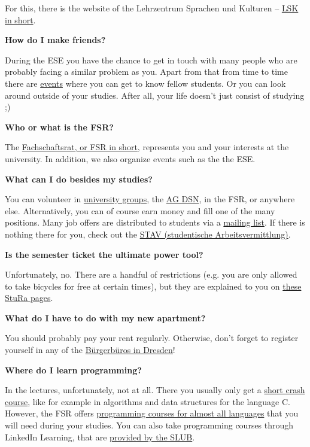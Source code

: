 For this, there is the website of the Lehrzentrum Sprachen und Kulturen -- \hyperlink{sec:sprache}{LSK in short}.

\textbf{How do I make friends?}

During the ESE you have the chance to get in touch with many people who are probably facing a similar problem as you. Apart from that from time to time there are \hyperlink{cha:veranstaltungen}{events} where you can get to know fellow students. 
Or you can look around outside of your studies. After all, your life doesn't just consist of studying ;)

\textbf{Who or what is the FSR?}

The \hyperlink{sec:fachschaftsrat}{Fachschaftsrat, or FSR in short,} 
represents you and your interests at the university. 
In addition, we also organize events such as the the ESE. 

\textbf{What can I do besides my studies?}

You can volunteer in \hyperlink{sec:hsg}{university groups}, the \href{https://www.agdsn.de}{AG DSN}, 
in the FSR, or anywhere else.
Alternatively, you can of course earn money and fill one of the many positions.
Many job offers are distributed to students via a 
\href{https://lists.ifsr.de/mm3/postorius/lists/extern.ifsr.de/}{mailing list}.
If there is nothing there for you, check out the 
\href{https://www.stav-dresden.de}{STAV (studentische Arbeitsvermittlung)}. 

\textbf{Is the semester ticket the ultimate power tool?}

Unfortunately, no. 
There are a handful of restrictions (e.g. you are only allowed to take bicycles for free at certain times),
but they are explained to you on \href{https://www.stura.tu-dresden.de/semesterticket}{these StuRa pages}.

\textbf{What do I have to do with my new apartment?}

You should probably pay your rent regularly. 
Otherwise, don't forget to register yourself in any of the \hyperlink{sec:ummelden}{Bürgerbüros in Dresden}!

\textbf{Where do I learn programming?}

In the lectures, unfortunately, not at all. 
There you usually only get a \hyperlink{sec:aud}{short crash course}, like for example in algorithms and data structures for the language C.
However, the FSR offers \href{https://kurse.ifsr.de}{programming courses for almost all languages} that you will need during your studies. 
You can also take programming courses through LinkedIn Learning,
that are 
\href{https://www.slub-dresden.de/forschen/datenbanken-zeitschriften-normen/datenbanken/trainingsvideos}{provided by the SLUB}.

